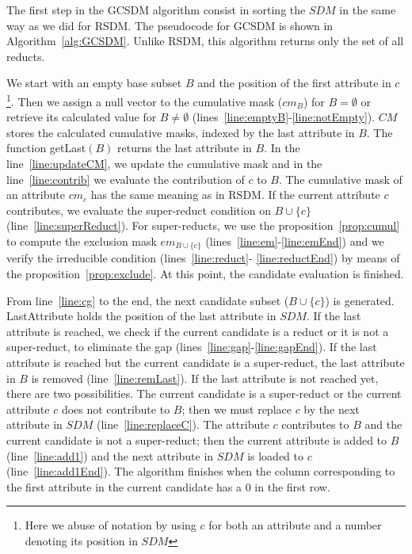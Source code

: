 \documentclass[authoryear,11pt]{elsarticle}
\begin{document}
	The first step in the GCSDM algorithm consist in sorting the $SDM$ in the same way as we did for RSDM. 
	The pseudocode for GCSDM is shown in Algorithm~\ref{alg:GCSDM}. Unlike RSDM, this algorithm returns
	only the set of all reducts.
	
	We start with an empty base subset $B$ and the position of the first attribute in $c$\footnote{Here we 
	abuse of notation by using $c$ for both an attribute and a number denoting its position in $SDM$}. Then
	we assign a null vector to the cumulative mask ($cm_B$) for $B=\emptyset$ or retrieve its calculated value
	for	$B\neq \emptyset$ (lines~\ref{line:emptyB}-\ref{line:notEmpty}). $CM$ stores the calculated cumulative 
	masks, indexed by the last attribute in $B$.	The function getLast$(B)$ returns the last attribute in $B$.
	In the line~\ref{line:updateCM}, we update the cumulative mask and in
	the line~\ref{line:contrib} we evaluate the contribution of $c$ to $B$. The cumulative mask of an 
	attribute $cm_c$ has the same meaning as in RSDM. If the current attribute $c$ contributes, we evaluate
	the super-reduct condition on $B\cup \lbrace c\rbrace$ (line~\ref{line:superReduct}). For super-reducts,
	we use the proposition~\ref{prop:cumul} to compute the exclusion mask $em_{B\cup \lbrace c\rbrace}$ 
	(lines~\ref{line:em}-\ref{line:emEnd}) and we verify the irreducible condition (lines~\ref{line:reduct}-
	\ref{line:reductEnd}) by means of the proposition~\ref{prop:exclude}. At this point, the candidate 
	evaluation is finished.
	
	From line~\ref{line:cg} to the end, the next candidate subset ($B\cup \lbrace c\rbrace$) is generated. 
	LastAttribute holds the position of the last attribute in $SDM$. If the last attribute is
	reached, we check if the current candidate is a reduct or it is not a super-reduct, to eliminate the gap
	(lines~\ref{line:gap}-\ref{line:gapEnd}). If the last attribute is reached but the current candidate is 
	a super-reduct, the last attribute in $B$ is removed (line~\ref{line:remLast}). If the last attribute is 
	not reached yet, there are two possibilities. The current candidate is a super-reduct or the current
	attribute $c$ does not contribute to $B$; then we must replace $c$ by the next attribute in $SDM$
	(line~\ref{line:replaceC}). The attribute $c$ contributes to $B$ and the current candidate is not a 
	super-reduct; then the current attribute is added to $B$ (line~\ref{line:add1}) and the next attribute in 
	$SDM$ is loaded to $c$ (line~\ref{line:add1End}). The algorithm finishes when the column corresponding 
	to the first attribute in the current candidate has a 0 in the first row.
	
\end{document}

